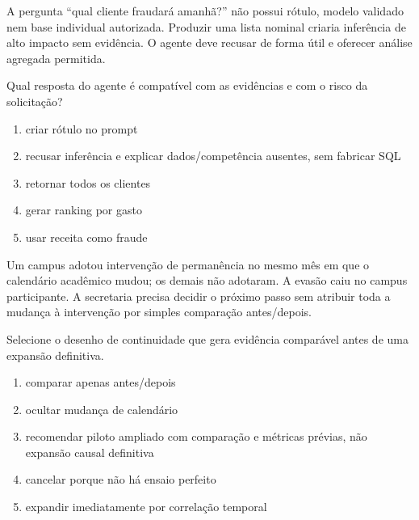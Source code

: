 \documentclass[12pt,a4paper]{article}
\begin{document}

\TextoBase

A pergunta ``qual cliente fraudará amanhã?'' não possui rótulo, modelo validado nem base individual autorizada. Produzir uma lista nominal criaria inferência de alto impacto sem evidência. O agente deve recusar de forma útil e oferecer análise agregada permitida.

\FonteDidatica

\Comando Qual resposta do agente é compatível com as evidências e com o risco da solicitação?

\begin{enumerate}[label=\Alph*)]
  \item criar rótulo no prompt
  \item recusar inferência e explicar dados/competência ausentes, sem fabricar SQL
  \item retornar todos os clientes
  \item gerar ranking por gasto
  \item usar receita como fraude
\end{enumerate}


\TextoBase

Um campus adotou intervenção de permanência no mesmo mês em que o calendário acadêmico mudou; os demais não adotaram. A evasão caiu no campus participante. A secretaria precisa decidir o próximo passo sem atribuir toda a mudança à intervenção por simples comparação antes/depois.

\FonteDidatica

\Comando Selecione o desenho de continuidade que gera evidência comparável antes de uma expansão definitiva.

\begin{enumerate}[label=\Alph*)]
  \item comparar apenas antes/depois
  \item ocultar mudança de calendário
  \item recomendar piloto ampliado com comparação e métricas prévias, não expansão causal definitiva
  \item cancelar porque não há ensaio perfeito
  \item expandir imediatamente por correlação temporal
\end{enumerate}
\end{document}
